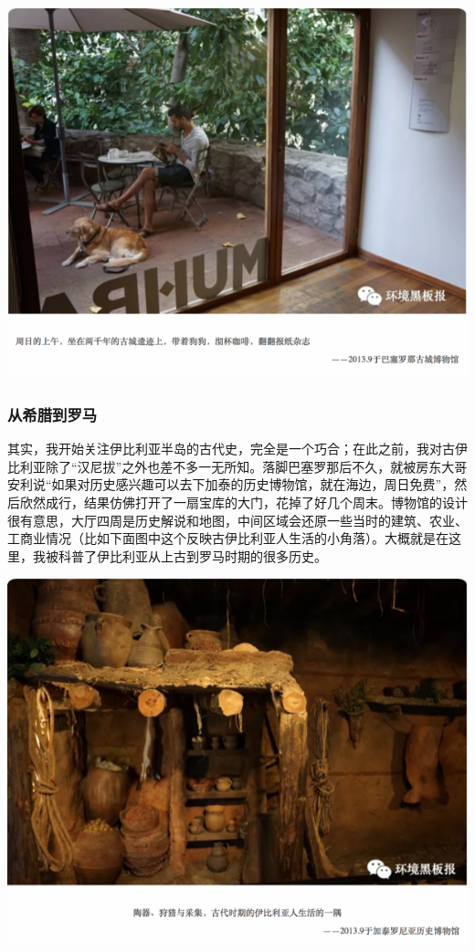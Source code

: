 \documentclass[]{book}
\begin{document}
\includegraphics[width=8.33in]{images/xt9}

\hypertarget{ux4eceux5e0cux814aux5230ux7f57ux9a6c}{%
\subsubsection{从希腊到罗马}\label{ux4eceux5e0cux814aux5230ux7f57ux9a6c}}

其实，我开始关注伊比利亚半岛的古代史，完全是一个巧合；在此之前，我对古伊比利亚除了``汉尼拔''之外也差不多一无所知。落脚巴塞罗那后不久，就被房东大哥安利说``如果对历史感兴趣可以去下加泰的历史博物馆，就在海边，周日免费''，然后欣然成行，结果仿佛打开了一扇宝库的大门，花掉了好几个周末。博物馆的设计很有意思，大厅四周是历史解说和地图，中间区域会还原一些当时的建筑、农业、工商业情况（比如下面图中这个反映古伊比利亚人生活的小角落）。大概就是在这里，我被科普了伊比利亚从上古到罗马时期的很多历史。

\includegraphics[width=8.33in]{images/xt10}
\end{document}
